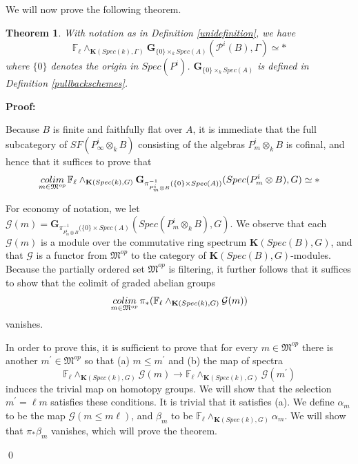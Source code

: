 \documentclass[11pt]{article}
\newcommand\mb{\mathbb}
\newcommand\mc{\mathcal}
\def \bK{\mathbf K}
\newcommand\mfk{\mathbf G}
\newtheorem{Theorem}{Theorem}[section]
\newenvironment{Proof}{\par\noindent\textbf{Proof:}}
{\qed}
\begin{document}
We will now prove the following theorem. 
\begin{Theorem} \label{vanishing} With notation as in Definition \ref{unidefinition}, we have
$$ {\mb{F}}_{\ell} \wedge _{\bK(Spec(k), \Gamma)}
    \mfk_{ \{ 0 \}\times _k Spec(A)}(\mc{P}^i(B) , \Gamma) \simeq  * 
$$
    where $\{ 0 \}$ denotes the origin in $Spec(P^i) $.  $\mfk _{ \{ 0 \}\times _k Spec(A) }$ is defined in Definition \ref{pullbackschemes}. 
\end{Theorem}
\begin{Proof} 

Because $B$ is finite and faithfully flat over $A$, it is immediate that the full subcategory of $SF(P^i _{\infty} \otimes _k B)$ consisting of the algebras $P^i_{m}  \otimes _k B$ is cofinal, and hence that it suffices to prove that 
$$ \underset{m \in \mathfrak{M}^{op}}{colim} \hspace{.05cm}\mb{F}_{\ell}\wedge _{\bK(Spec(k),G)} \mfk _{\pi ^{-1}_{P^i_m \otimes B}(\{ 0 \} \times Spec(A) )}(Spec(P^i_m \otimes B),G) \simeq *
$$


For economy of notation, we let $\mc{G}(m) = \mfk _{\pi ^{-1}_{P^i_m\otimes B}(\{ 0 \} \times Spec(A)} (Spec(P^i _m \otimes _k B),G)$. We observe that each $\mc{G}(m) $ is a module over the commutative ring spectrum $\bK(Spec(B), G)$, and that $\mc{G}$ is a functor from $\mathfrak{M}^{op}$ to the category of $\bK(Spec(B), G)$-modules.   Because the partially ordered set $\mathfrak{M}^{op}$ is  filtering, it further follows that it suffices to show that the colimit of graded abelian groups 
$$  \underset{m \in \mathfrak{M}^{op}}{colim} \hspace{.05cm}\pi _* (\mb{F}_{\ell}\wedge _{\bK(Spec(k),G)} \mc{G}(m))  $$
vanishes. 

In order to prove this, it is sufficient to prove that for every $m \in \mathfrak{M}^{op}$ there is another $m^{\prime} \in \mathfrak{M}^{op}$ so  that  (a) $m \leq m^{\prime}$ and (b) the map of spectra 
$$ \mb{F}_{\ell}\wedge _{\bK(Spec(k),G)} \mc{G}(m)  \rightarrow \mb{F}_{\ell}\wedge _{\bK(Spec(k),G)} \mc{G}(m^{\prime}) 
$$
 induces the trivial map on homotopy groups.  We will show that the selection $m^{\prime} = \ell m$ satisfies these conditions.  It is trivial that it satisfies (a). We define $\alpha_m$ to be the map $\mc{G}(m \leq m \ell)$, and $\beta _m$ to be $\mb{F}_{\ell} \wedge _{\bK (Spec(k),G)}\alpha _m$.  We will show that $\pi _* \beta _m$ vanishes, which will prove the theorem.  




\end{Proof}
\end{document}

